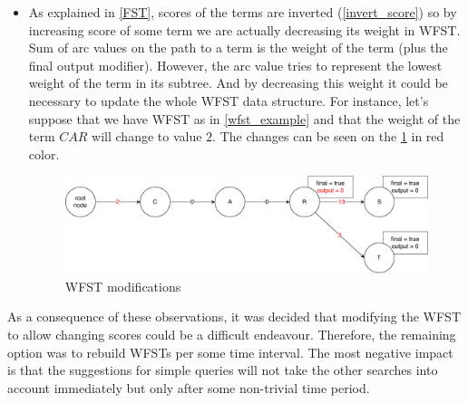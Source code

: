 \begin{itemize}
    \item As explained in \ref{FST}, scores of the terms are inverted (\ref{invert_score}) so by increasing score of some term
    we are actually decreasing its weight in WFST. Sum of arc values on the path to a term is the weight of the term (plus the final output modifier).
    However, the arc value tries to represent the lowest weight of the term in its subtree. And by decreasing this weight
    it could be necessary to update the whole WFST data structure. For instance, let's suppose that we have WFST as in \ref{wfst_example}
    and that the weight of the term $CAR$ will change to value $2$. The changes can be seen on the \ref{wfst_modified} in red color.

    \begin{figure}[htbp]
    \centering
    \includegraphics[width=145mm]{../img/wfst_modified.pdf}
    \caption{WFST modifications}
    \label{wfst_modified}
    \end{figure}

\end{itemize}

As a consequence of these observations, it was decided that modifying the WFST to allow changing scores could be a difficult
endeavour. Therefore, the remaining option was to rebuild WFSTs per some time interval. The most negative impact is that the
suggestions for simple queries will not take the other searches into account immediately but only after some non-trivial time period.

